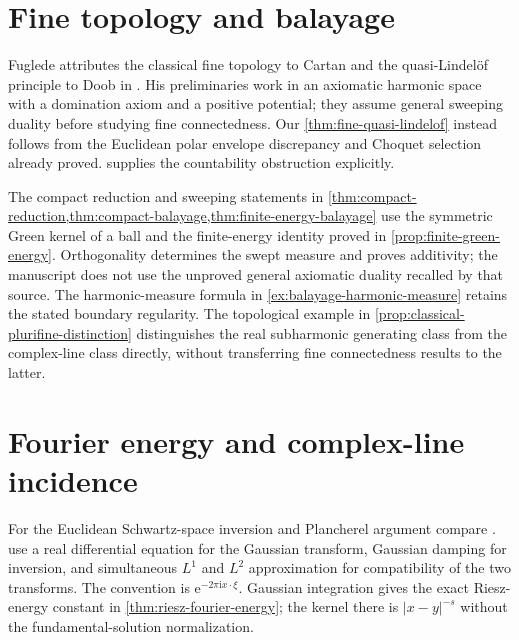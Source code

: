 \section{Fine topology and balayage}
\label{sec:history-fine}
Fuglede attributes the classical fine topology to Cartan and the quasi-Lindel\"of principle to Doob in \cite[Introduction, p.~227]{Fug71Fine}. His preliminaries \cite[Section 1, pp.~228--230]{Fug71Fine} work in an axiomatic harmonic space with a domination axiom and a positive potential; they assume general sweeping duality before studying fine connectedness. Our \cref{thm:fine-quasi-lindelof} instead follows from the Euclidean polar envelope discrepancy and Choquet selection already proved.  supplies the countability obstruction explicitly.

The compact reduction and sweeping statements in \cref{thm:compact-reduction,thm:compact-balayage,thm:finite-energy-balayage} use the symmetric Green kernel of a ball and the finite-energy identity proved in \cref{prop:finite-green-energy}. Orthogonality determines the swept measure and proves additivity; the manuscript does not use the unproved general axiomatic duality recalled by that source. The harmonic-measure formula in \cref{ex:balayage-harmonic-measure} retains the stated boundary regularity. The topological example in \cref{prop:classical-plurifine-distinction} distinguishes the real subharmonic generating class from the complex-line class directly, without transferring fine connectedness results to the latter.

\section{Fourier energy and complex-line incidence}
\label{sec:history-fourier-incidence}
For the Euclidean Schwartz-space inversion and Plancherel argument compare \cite[Exercises 38--42, formula (11), Theorem 43 and Exercise 44]{Tao09Fourier}.  use a real differential equation for the Gaussian transform, Gaussian damping for inversion, and simultaneous $L^1$ and $L^2$ approximation for compatibility of the two transforms. The convention is $\mathrm e^{-2\pi\mathrm i x\cdot\xi}$. Gaussian integration gives the exact Riesz-energy constant in \cref{thm:riesz-fourier-energy}; the kernel there is $|x-y|^{-s}$ without the fundamental-solution normalization.

